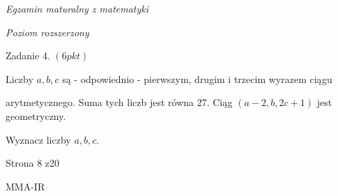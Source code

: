 \documentclass[a4paper,12pt]{article}
\begin{document}
{\it Egzamin maturalny z matematyki}

{\it Poziom rozszerzony}

Zadanie 4. $(6pkt)$

Liczby $a, b, c$ są - odpowiednio - pierwszym, drugim i trzecim wyrazem ciągu

arytmetycznego. Suma tych liczb jest równa 27. Ciąg $(a-2,b,2c+1)$ jest geometryczny.

Wyznacz liczby $a, b, c.$

Strona 8 z20

MMA-IR
\end{document}
